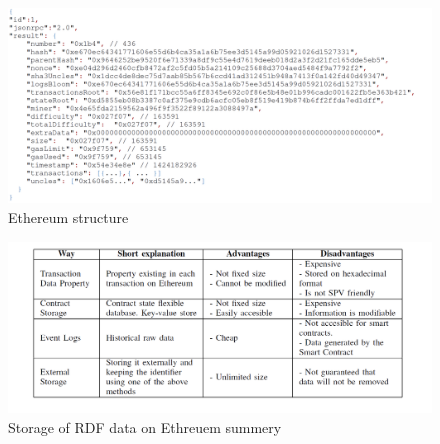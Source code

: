 \begin{center}
	\begin{figure}[htb!]
		
		\begin{minipage}{0.55\linewidth}
			\centering
			\includegraphics[width=1.95\textwidth]{images/chap02_Eth_str.png}
		\end{minipage}
		\caption[Ethreuem structure]{Ethereum structure}
		
	\end{figure}
	
\end{center}
\begin{center}
	\begin{figure}[htb!]
		
		\begin{minipage}{0.55\linewidth}
			\centering
			\includegraphics[width=1.95\textwidth]{images/chap02_Eth_Table.png}
		\end{minipage}
		\caption[Storage of RDF data on Ethreuem summery]{Storage of RDF data on Ethreuem summery\cite{Hector}}
		
	\end{figure}
	
\end{center}

